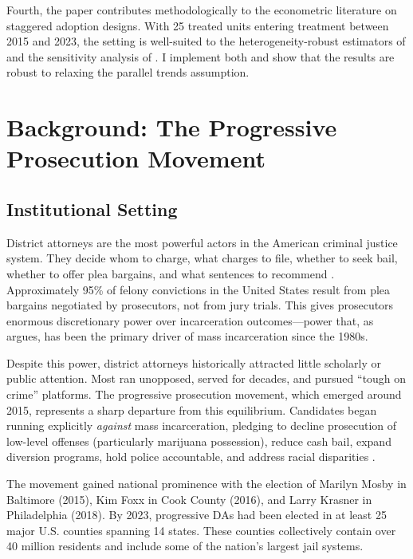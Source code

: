 \documentclass[12pt]{article}
\begin{document}
Fourth, the paper contributes methodologically to the econometric literature on staggered adoption designs. With 25 treated units entering treatment between 2015 and 2023, the setting is well-suited to the heterogeneity-robust estimators of \citet{callaway2021did} and the sensitivity analysis of \citet{rambachan2023honest}. I implement both and show that the results are robust to relaxing the parallel trends assumption.



\section{Background: The Progressive Prosecution Movement}

\subsection{Institutional Setting}

District attorneys are the most powerful actors in the American criminal justice system. They decide whom to charge, what charges to file, whether to seek bail, whether to offer plea bargains, and what sentences to recommend \citep{pfaff2017locked}. Approximately 95\% of felony convictions in the United States result from plea bargains negotiated by prosecutors, not from jury trials. This gives prosecutors enormous discretionary power over incarceration outcomes---power that, as \citet{pfaff2017locked} argues, has been the primary driver of mass incarceration since the 1980s.

Despite this power, district attorneys historically attracted little scholarly or public attention. Most ran unopposed, served for decades, and pursued ``tough on crime'' platforms. The progressive prosecution movement, which emerged around 2015, represents a sharp departure from this equilibrium. Candidates began running explicitly \textit{against} mass incarceration, pledging to decline prosecution of low-level offenses (particularly marijuana possession), reduce cash bail, expand diversion programs, hold police accountable, and address racial disparities \citep{sklansky2018changing, baumer2022da}.

The movement gained national prominence with the election of Marilyn Mosby in Baltimore (2015), Kim Foxx in Cook County (2016), and Larry Krasner in Philadelphia (2018). By 2023, progressive DAs had been elected in at least 25 major U.S. counties spanning 14 states. These counties collectively contain over 40 million residents and include some of the nation's largest jail systems.
\end{document}
